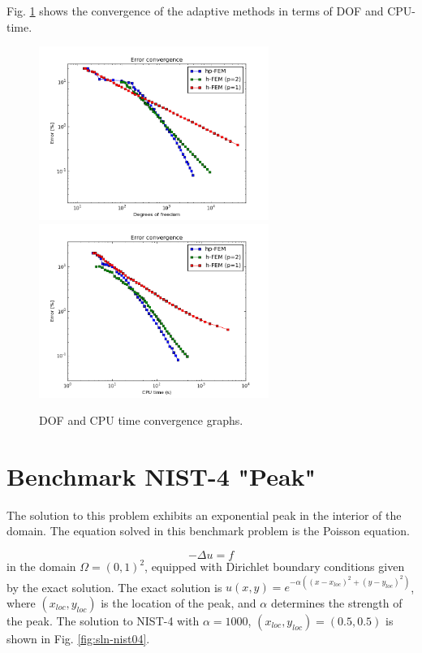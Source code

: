 \documentclass[12pt]{elsarticle}
\begin{document}
Fig. \ref{fig:nist-3-conv} shows the convergence of the adaptive methods in terms of DOF and CPU-time.

\begin{figure}[H]
\centering
\hspace{-50mm}
\includegraphics[width=7.5cm]{nist/nist-3/conv_dof_aniso.png}\ \
\hspace{-10mm}
\includegraphics[width=7.5cm]{nist/nist-3/conv_cpu_aniso.png}
\hspace{-50mm}
\caption{DOF and CPU time convergence graphs.}
\label{fig:nist-3-conv}
\end{figure}


\section{Benchmark NIST-4 "Peak"}
\label{sec:bench-4}

The solution to this problem exhibits an exponential peak in the interior of the domain.
The equation solved in this benchmark problem is the Poisson equation.

\begin{equation} \label{poisson-peak}
-\Delta u = f
\end{equation}
in the domain $\Omega = (0, 1)^2$, equipped with Dirichlet
boundary conditions given by the exact solution.
The exact solution is
$u(x,y) = e^{-\alpha ((x - x_{loc})^{2} + (y - y_{loc})^{2})}$,
where $(x_{loc}, y_{loc})$ is the location of the peak,
and $\alpha$ determines the strength of the peak.
The solution to NIST-4 with $\alpha = 1000$,
$(x_{loc}, y_{loc}) = (0.5, 0.5)$ is shown in Fig. \ref{fig:sln-nist04}.
\end{document}
